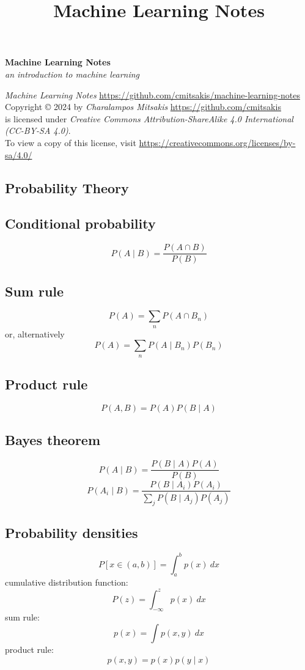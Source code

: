 \documentclass{article}
\title{Machine Learning Notes}
\begin{document}
\begin{center}
	\Huge\textbf{Machine Learning Notes}\\
	\LARGE\textit{an introduction to machine learning}
\end{center}

\textit{Machine Learning Notes} \url{https://github.com/cmitsakis/machine-learning-notes} \\
Copyright © 2024 by \textit{Charalampos Mitsakis} \url{https://github.com/cmitsakis} \\
is licensed under \textit{Creative Commons Attribution-ShareAlike 4.0 International (CC-BY-SA 4.0)}. \\
To view a copy of this license, visit \url{https://creativecommons.org/licenses/by-sa/4.0/}


\begin{multicols}{2}


\section{Probability Theory}

\subsection{Conditional probability}
\[P(A \mid B) = \frac{P(A \cap B)}{P(B)}\]

\subsection{Sum rule}
\[P(A)=\sum_n P(A \cap B_n)\]
or, alternatively
\[P(A)=\sum_n P(A \mid B_n) P(B_n)\]

\subsection{Product rule}
\[P(A, B) = P(A) P(B \mid A)\]

\subsection{Bayes theorem}
\[P(A \mid B) = \frac{P(B \mid A) P(A)}{P(B)}\]
\[P(A_i \mid B) = \frac{P(B \mid A_i) P(A_i)}{\sum\limits_j P(B \mid A_j) P(A_j)}\]

\subsection{Probability densities}
\[P[x \in (a, b)] = \int_a^b p(x)\ dx\]
cumulative distribution function:
\[P(z) = \int_{-\infty}^z p(x)\ dx\]
sum rule:
\[p(x) = \int p(x, y)\ dx\]
product rule:
\[p(x, y) = p(x) p(y \mid x)\]


\end{multicols}
\end{document}
